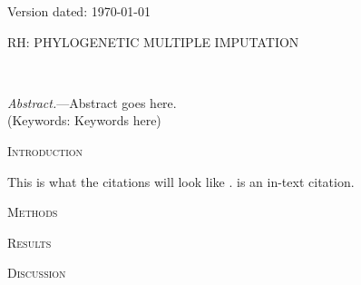 \documentclass[a4paper]{article}
\renewcommand{\section}[1]{%
\bigskip
\begin{center}
\begin{Large}
\normalfont\scshape #1
\medskip
\end{Large}
\end{center}}
\renewcommand{\subsubsection}[1]{%
\vspace{2ex}
\noindent
\textit{#1.}---}
\begin{document}
\begin{flushright}
Version dated: \today
\end{flushright}
\bigskip
\noindent RH: PHYLOGENETIC MULTIPLE IMPUTATION
\bigskip
\medskip
\begin{center}
\bigskip
\linebreak
{}\\ %
\end{center}
\medskip
\begin{center}
\end{center}

\medskip

\linenumbers
\justify
\subsubsection{Abstract}Abstract goes here.\\
\noindent (Keywords: Keywords here)\\
\newpage


\section{Introduction}

This is what the citations will look like \citep{MIdiagnostics,van07,Buuren2000}. \citet{miRubin} is an in-text citation.

\section{Methods}
\section{Results} 
\section{Discussion}
\end{document}
